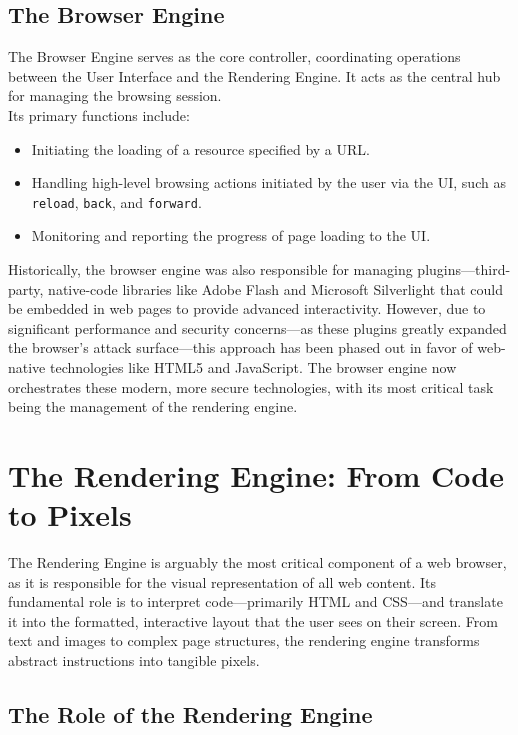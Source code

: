 \documentclass{scrbook}
\begin{document}
\section{The Browser Engine}

The Browser Engine serves as the core controller, coordinating operations between the User Interface and the Rendering Engine. It acts as the central hub for managing the browsing session. \\

Its primary functions include:

\begin{itemize}
    \item Initiating the loading of a resource specified by a URL.
    \item Handling high-level browsing actions initiated by the user via the UI, such as \texttt{reload}, \texttt{back}, and \texttt{forward}.
    \item Monitoring and reporting the progress of page loading to the UI.
\end{itemize}

Historically, the browser engine was also responsible for managing plugins—third-party, native-code libraries like Adobe Flash and Microsoft Silverlight that could be embedded in web pages to provide advanced interactivity. However, due to significant performance and security concerns—as these plugins greatly expanded the browser's attack surface—this approach has been phased out in favor of web-native technologies like HTML5 and JavaScript. The browser engine now orchestrates these modern, more secure technologies, with its most critical task being the management of the rendering engine.

\chapter{The Rendering Engine: From Code to Pixels}

The Rendering Engine is arguably the most critical component of a web browser, as it is responsible for the visual representation of all web content. Its fundamental role is to interpret code—primarily HTML and CSS—and translate it into the formatted, interactive layout that the user sees on their screen. From text and images to complex page structures, the rendering engine transforms abstract instructions into tangible pixels.

\section{The Role of the Rendering Engine}
\end{document}
